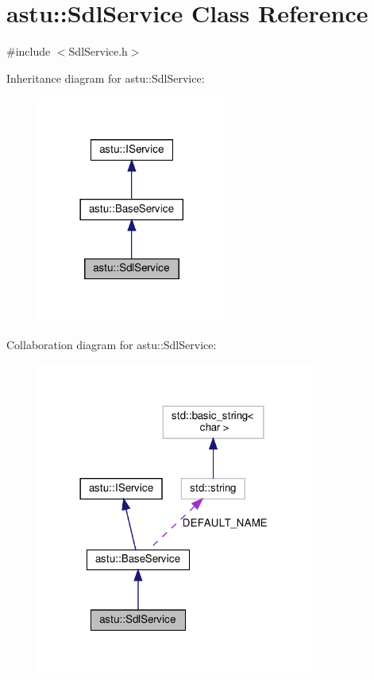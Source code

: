 \hypertarget{classastu_1_1SdlService}{}\section{astu\+:\+:Sdl\+Service Class Reference}
\label{classastu_1_1SdlService}


{\ttfamily \#include $<$Sdl\+Service.\+h$>$}



Inheritance diagram for astu\+:\+:Sdl\+Service\+:\nopagebreak
\begin{figure}[H]
\begin{center}
\leavevmode
\includegraphics[width=177pt]{classastu_1_1SdlService__inherit__graph}
\end{center}
\end{figure}


Collaboration diagram for astu\+:\+:Sdl\+Service\+:\nopagebreak
\begin{figure}[H]
\begin{center}
\leavevmode
\includegraphics[width=258pt]{classastu_1_1SdlService__coll__graph}
\end{center}
\end{figure}
